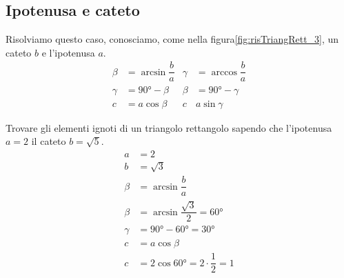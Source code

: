 \subsection{Ipotenusa e cateto}
Risolviamo questo caso, conosciamo, come nella figura\nobs\vref*{fig:risTriangRett_3}, un cateto $b$ e l'ipotenusa $a$.
\begin{align*}
\beta&=\arcsin\dfrac{b}{a}&\gamma&=\arccos\dfrac{b}{a}\\
\gamma&=\ang{90}-\beta&\beta&=\ang{90}-\gamma\\
c&=a\cos\beta&c&a\sin\gamma
\end{align*}
\begin{esempio}
Trovare gli elementi ignoti di un triangolo rettangolo sapendo che l'ipotenusa $a=2$  il cateto $b=\sqrt{5}$.
\begin{align*}
a&=\num{2}\\
b&=\sqrt{\num{3}}\\
\beta&=\arcsin\dfrac{b}{a}\\
\beta&=\arcsin\dfrac{\sqrt{3}}{2}=\ang{60}\\
\gamma&=\ang{90}-\ang{60}=\ang{30}\\
c&=a\cos\beta\\
c&=2\cos\ang{60}=2\cdot\dfrac{1}{2}=1
\end{align*} 
\end{esempio}
